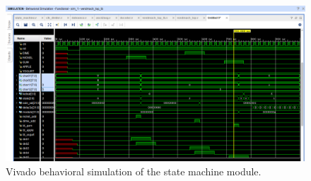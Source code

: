 \begin{figure}[H]
	\centering
	\includegraphics[width=1.0\textwidth ]{01_images/Simulation_state_machine.PNG}
	\caption{Vivado behavioral simulation of the state machine module.}
	\label{fig: Simulation_state_machine}
\end{figure}
%
%
%
%
